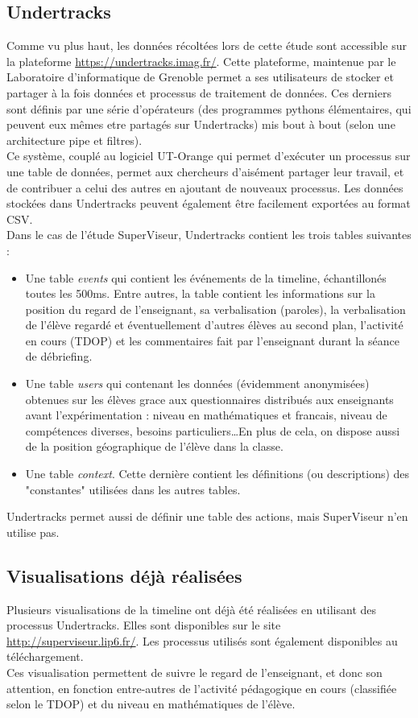 \documentclass{article}
\begin{document}
\subsection{Undertracks}
Comme vu plus haut, les données récoltées lors de cette étude sont accessible sur la plateforme \href{https://undertracks.imag.fr/}{https://undertracks.imag.fr/}.
Cette plateforme, maintenue par le Laboratoire d'informatique de Grenoble permet a ses utilisateurs de stocker et partager à la fois données et processus de traitement de données. Ces derniers sont définis par une série d'opérateurs (des programmes pythons élémentaires, qui peuvent eux mêmes etre partagés sur Undertracks) mis bout à bout (selon une architecture pipe et filtres).\\
Ce système, couplé au logiciel UT-Orange qui permet d'exécuter un processus sur une table de données, permet aux chercheurs d'aisément partager leur travail, et de contribuer a celui des autres en ajoutant de nouveaux processus. Les données stockées dans Undertracks peuvent également être facilement exportées au format CSV.\\
Dans le cas de l'étude SuperViseur, Undertracks contient les trois tables suivantes :
\begin{itemize}
  \item Une table \textit{events} qui contient les événements de la timeline, échantillonés toutes les 500ms. Entre autres, la table contient les informations sur la position du regard de l'enseignant, sa verbalisation (paroles), la verbalisation de l'élève regardé et éventuellement d'autres élèves au second plan, l'activité en cours (TDOP) et les commentaires fait par l'enseignant durant la séance de débriefing.
  \item Une table \textit{users} qui contenant les données (évidemment anonymisées) obtenues sur les élèves grace aux questionnaires distribués aux enseignants avant l'expérimentation : niveau en mathématiques et francais, niveau de compétences diverses, besoins particuliers\ldots En plus de cela, on dispose aussi de la position géographique de l'élève dans la classe.
  \item Une table \textit{context}. Cette dernière contient les définitions (ou descriptions) des "constantes" utilisées dans les autres tables.
\end{itemize}
Undertracks permet aussi de définir une table des actions, mais SuperViseur n'en utilise pas.

\subsection{Visualisations déjà réalisées}
Plusieurs visualisations de la timeline ont déjà été réalisées en utilisant des processus Undertracks. Elles sont disponibles sur le site \href{http://superviseur.lip6.fr/}{http://superviseur.lip6.fr/}. Les processus utilisés sont également disponibles au téléchargement.\\
Ces visualisation permettent de suivre le regard de l'enseignant, et donc son attention, en fonction entre-autres de l'activité pédagogique en cours (classifiée selon le TDOP) et du niveau en mathématiques de l'élève.\\
\end{document}
